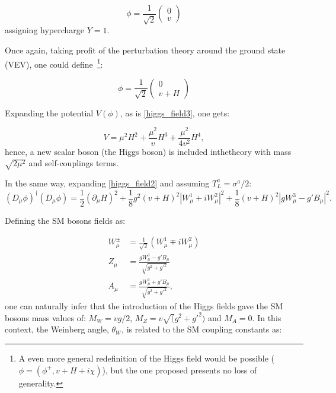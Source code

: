 \begin{equation}
    \phi = \frac{1}{\sqrt{2}}
        \left ( 
        \begin{matrix}
        0 \\
        v 
        \end{matrix}
        \right )
    \label{higgs_field_vev_based}
\end{equation}
assigning hypercharge $Y=1$.

Once again, taking profit of the perturbation theory around the ground state (VEV), one could define~\footnote{A even more general redefinition of the Higgs field would be possible ($\phi = (\phi^+, v + H +i \chi)$), but the one proposed presents no loss of generality.}:

\begin{equation}
    \phi = \frac{1}{\sqrt{2}}
        \left ( 
        \begin{matrix}
        0 \\
        v + H
        \end{matrix}
        \right )
    \label{higgs_field_vev_based}
\end{equation}

Expanding the potential $V(\phi)$, as is \ref{higgs_field3}, one gets:

\begin{equation}
    V = \mu^2 H^2 + \frac{\mu^2}{v} H^3 + \frac{\mu^2}{4v^2} H^4,
    \label{higgs_mass_term}
\end{equation}
hence, a new scalar boson (the Higgs boson) is included inthetheory with mass $\sqrt{2\mu^2}$ and self-couplings terms.

In the same way, expanding \ref{higgs_field2} and assuming $T_L^a = \sigma^a/2$: 
\begin{equation}
    (D_\mu\phi)^\dagger(D_\mu\phi) = \frac{1}{2}(\partial_\mu H)^2 + \frac{1}{8}g^2(v+H)^2|W_\mu^1+iW_\mu^2|^2 + \frac{1}{8}(v+H)^2|gW_\mu^3-g'B_\mu|^2.
    \label{higgs_mass_term}
\end{equation}

Defining the SM bosons fields as:

\begin{equation}
    \begin{split}
        W_\mu^\pm &= \frac{1}{\sqrt{2}} (W_\mu^1 \mp iW_\mu^2) \\ 
        Z_\mu &= \frac{gW_\mu^3-g'B_\mu}{\sqrt{g^2+g'^2}} \\ 
        A_\mu &= \frac{gW_\mu^3+g'B_\mu}{\sqrt{g^2+g'^2}},
    \end{split}
    \label{sm_bosons_fields}
\end{equation}
one can naturally infer that the introduction of the Higgs fields gave the SM bosons mass values of: $M_W = vg/2$, $M_Z = v\sqrt(g^2+g'^2)$ and $M_A = 0$. In this context, the Weinberg angle, $\theta_W$, is related to the SM coupling constants as:


